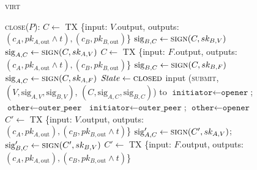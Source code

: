 \begin{figure}[H]
\begin{processbox}{\textsc{virt}}
\begin{algorithmic}[1]
      \State \textsc{close}($P$):
            \State {}
            \State $C \gets$ TX \{input: $V$.output, outputs: $(c_A, pk_{A,
            \mathrm{out}} \wedge t), (c_B, pk_{B, \mathrm{out}})$\}
            \State $\mathrm{sig}_{B, C} \gets \textsc{sign}(C, sk_{B, V})$
            \State $\mathrm{sig}_{A, C} \gets \textsc{sign}(C, sk_{A, V})$
          \Else
            \State $C \gets$ TX \{input: $F$.output, outputs: $(c_A, pk_{A,
            \mathrm{out}} \wedge t), (c_B, pk_{B, \mathrm{out}})$\}
            \State $\mathrm{sig}_{B, C} \gets \textsc{sign}(C, sk_{B, F})$
            \State $\mathrm{sig}_{A, C} \gets \textsc{sign}(C, sk_{A, F})$
          \EndIf
        \EndIf \: 
        \State $\mathit{State} \gets \textsc{closed}$
          \State input (\textsc{submit}, $(V, \mathrm{sig}_{A, V},
          \mathrm{sig}_{B, V})$, $(C, \mathrm{sig}_{A, C}, \mathrm{sig}_{B,
          C})$) to \ledger
        \Else \: 
            \State $\texttt{initiator} \gets \texttt{opener}$; $\texttt{other}
            \gets \texttt{outer\_peer}$
          \Else \: 
            \State $\texttt{initiator} \gets \texttt{outer\_peer}$;
            $\texttt{other} \gets \texttt{opener}$
          \EndIf
              \State {}
              \State $C' \gets$ TX \{input: $V$.output, outputs: $(c_A, pk_{A,
              \mathrm{out}}), (c_B, pk_{B, \mathrm{out}} \wedge t)$\}
              \State $\mathrm{sig}_{A, C}' \gets \textsc{sign}(C', sk_{A, V})$;
              $\mathrm{sig}_{B, C}' \gets \textsc{sign}(C', sk_{B, V})$
            \Else \: 
              \State $C' \gets$ TX \{input: $F$.output, outputs: $(c_A, pk_{A,
              \mathrm{out}}), (c_B, pk_{B, \mathrm{out}} \wedge t)$\}

\end{algorithmic}
\end{processbox}
\end{figure}
